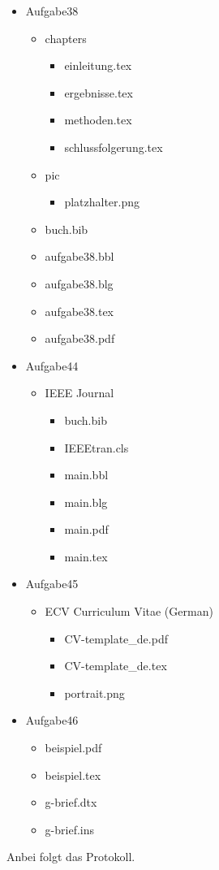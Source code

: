 \documentclass[11pt,ngerman,latin9]{g-brief}
\begin{document}
\begin{g-brief}
\begin{itemize}
 \item Aufgabe38
 \begin{itemize}
  \item chapters
  \begin{itemize}
   \item einleitung.tex
   \item ergebnisse.tex
   \item methoden.tex
   \item schlussfolgerung.tex
  \end{itemize}

  \item pic
  \begin{itemize}
   \item platzhalter.png
  \end{itemize}

  \item buch.bib
  \item aufgabe38.bbl
  \item aufgabe38.blg
  \item aufgabe38.tex
  \item aufgabe38.pdf
 \end{itemize}
 
 \pagebreak
 \item Aufgabe44
 \begin{itemize}
  \item IEEE Journal
  \begin{itemize}
   \item buch.bib
   \item IEEEtran.cls
   \item main.bbl
   \item main.blg
   \item main.pdf
   \item main.tex
  \end{itemize}
 \end{itemize}

 \item Aufgabe45
 \begin{itemize}
  \item ECV Curriculum Vitae (German)
  \begin{itemize}
   \item CV-template\_de.pdf
   \item CV-template\_de.tex
   \item portrait.png
  \end{itemize}
 \end{itemize}

 \item Aufgabe46
 \begin{itemize}
  \item beispiel.pdf
  \item beispiel.tex
  \item g-brief.dtx
  \item g-brief.ins
 \end{itemize}
\end{itemize}

Anbei folgt das Protokoll.

\end{g-brief}
\end{document}
